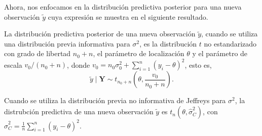 \documentclass[10pt,openright]{book}\usepackage[]{graphicx}\usepackage[]{color}
\begin{document}
Ahora, nos enfocamos en la distribuci\'on predictiva posterior para una nueva observaci\'on $\tilde{y}$ cuya expresi\'on se muestra en el siguiente resultado.
    \begin{Res}\label{pred_yy_sigma2}
    La distribuci\'on predictiva posterior de una nueva observaci\'on $\tilde{y}$, cuando se utiliza una distribuci\'on previa informativa para $\sigma^2$, es la distribuci\'on $t$ no estandarizado con grado de libertad $n_0+n$, el par\'ametro de localizaci\'on $\theta$ y el par\'ametro de escala $v_0/(n_0+n)$, donde $v_0=n_0\sigma^2_0+\sum_{i=1}^n(y_i-\theta)^2$, esto es, 
    \begin{equation*}
    \tilde{y} \mid \mathbf{Y}\sim t_{n_0+n}\left(\theta,\frac{v_0}{n_0+n}\right).
    \end{equation*} 
    
    Cuando se utiliza la distribuci\'on previa no informativa de Jeffreys para $\sigma^2$, la distrubci\'on predictiva de una nueva observaci\'on $\tilde{y}$ es $t_n(\theta,\hat{\sigma}^2_C)$, con $\hat{\sigma}^2_C=\frac{1}{n}\sum_{i=1}^n(y_i-\theta)^2$. 
    \end{Res}
    
\end{document}
